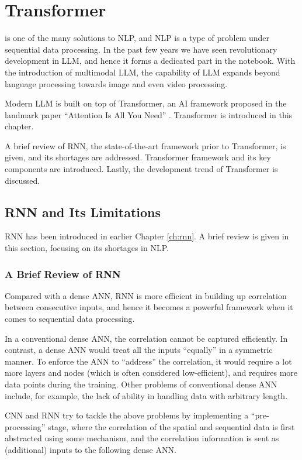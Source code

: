 \chapter{Transformer} \label{ch:transformer}

 is one of the many solutions to NLP, and NLP is a type of problem under sequential data processing. In the past few years we have seen revolutionary development in LLM, and hence it forms a dedicated part in the notebook. With the introduction of multimodal LLM, the capability of LLM expands beyond language processing towards image and even video processing. 

Modern LLM is built on top of Transformer, an AI framework proposed in the landmark paper ``Attention Is All You Need'' \cite{vaswani2017attention}. Transformer is introduced in this chapter. 

A brief review of RNN, the state-of-the-art framework prior to Transformer, is given, and its shortages are addressed. Transformer framework and its key components are introduced. Lastly, the development trend of Transformer is discussed.

\section{RNN and Its Limitations}

RNN has been introduced in earlier Chapter \ref{ch:rnn}. A brief review is given in this section, focusing on its shortages in NLP.

\subsection{A Brief Review of RNN}

Compared with a dense ANN, RNN is more efficient in building up correlation between consecutive inputs, and hence it becomes a powerful framework when it comes to sequential data processing. 

In a conventional dense ANN, the correlation cannot be captured efficiently. In contrast, a dense ANN would treat all the inputs ``equally'' in a symmetric manner. To enforce the ANN to ``address'' the correlation, it would require a lot more layers and nodes (which is often considered low-efficient), and requires more data points during the training. Other problems of conventional dense ANN include, for example, the lack of ability in handling data with arbitrary length.

CNN and RNN try to tackle the above problems by implementing a ``pre-processing'' stage, where the correlation of the spatial and sequential data is first abstracted using some mechanism, and the correlation information is sent as (additional) inputs to the following dense ANN.


